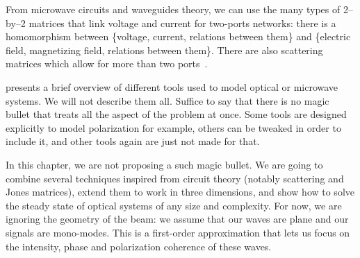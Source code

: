 From microwave circuits and waveguides theory, we can use the many types of 2--by--2 matrices that link voltage and current for two-ports networks: there is a homomorphism between \{voltage, current, relations between them\} and \{electric field, magnetizing field, relations between them\}.
There are also scattering matrices which allow for more than two ports~\cite{pozar2009microwave}.

 presents a brief overview of different tools used to model optical or microwave systems.
We will not describe them all.
Suffice to say that there is no magic bullet that treats all the aspect of the problem at once.
Some tools are designed explicitly to model polarization for example, others can be tweaked in order to include it, and other tools again are just not made for that.

In this chapter, we are not proposing a such magic bullet.
We are going to combine several techniques inspired from circuit theory (notably scattering and Jones matrices), extend them to work in three dimensions, and show how to solve the steady state of optical systems of any size and complexity.
For now, we are ignoring the geometry of the beam: we assume that our waves are plane and our signals are mono-modes.
This is a first-order approximation that lets us focus on the intensity, phase and polarization coherence of these waves.

